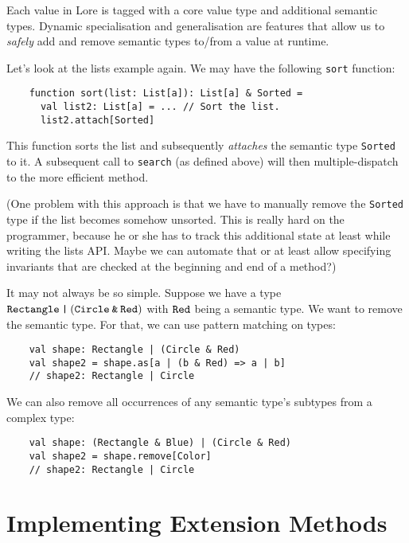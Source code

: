 
Each value in Lore is tagged with a core value type and additional semantic types. Dynamic specialisation and generalisation are features that allow us to \textit{safely} add and remove semantic types to/from a value at runtime.

Let's look at the lists example again. We may have the following \texttt{sort} function:
\begin{lstlisting}
    function sort(list: List[a]): List[a] & Sorted =
      val list2: List[a] = ... // Sort the list.
      list2.attach[Sorted]
\end{lstlisting}

\noindent This function sorts the list and subsequently \textit{attaches} the semantic type \texttt{Sorted} to it. A subsequent call to \texttt{search} (as defined above) will then multiple-dispatch to the more efficient method.

(One problem with this approach is that we have to manually remove the \texttt{Sorted} type if the list becomes somehow unsorted. This is really hard on the programmer, because he or she has to track this additional state at least while writing the lists API. Maybe we can automate that or at least allow specifying invariants that are checked at the beginning and end of a method?) 

It may not always be so simple. Suppose we have a type $\texttt{Rectangle} \mathbin{\texttt{|}} (\texttt{Circle} \mathbin{\texttt{\&}} \texttt{Red})$ with $\texttt{Red}$ being a semantic type. We want to remove the semantic type. For that, we can use pattern matching on types:
\begin{lstlisting}
    val shape: Rectangle | (Circle & Red)
    val shape2 = shape.as[a | (b & Red) => a | b]
    // shape2: Rectangle | Circle
\end{lstlisting}

\noindent We can also remove all occurrences of any semantic type's subtypes from a complex type:
\begin{lstlisting}
    val shape: (Rectangle & Blue) | (Circle & Red)
    val shape2 = shape.remove[Color]
    // shape2: Rectangle | Circle
\end{lstlisting}



\section{Implementing Extension Methods}

